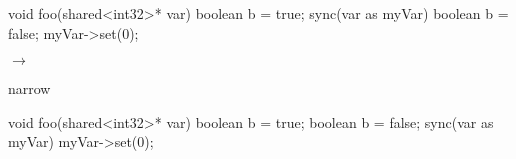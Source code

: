\begin{minipage}{0.3\textwidth}
\begin{ccode}
void foo(shared<int32>* var) {
  boolean b = true;
  sync(var as myVar) {
    boolean b = false;
    myVar->set(0);
  }
}
\end{ccode}
\end{minipage}
\begin{minipage}{0.2\textwidth}
\begin{center}
$\longrightarrow$

narrow
\end{center}
\end{minipage}
\begin{minipage}{0.3\textwidth}
\begin{ccode}
void foo(shared<int32>* var) {
  boolean b = true;
  {
    boolean b = false;
    sync(var as myVar) { myVar->set(0); }
  }
}
\end{ccode}
\end{minipage}

